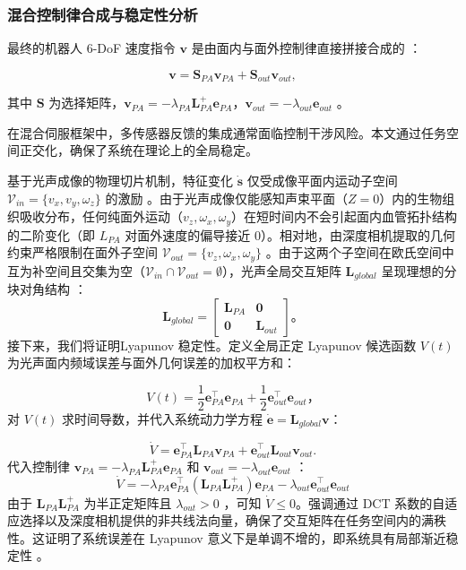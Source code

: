 \documentclass{article}
\begin{document}
\subsubsection{混合控制律合成与稳定性分析}
最终的机器人 6-DoF 速度指令 $\mathbf{v}$ 是由面内与面外控制律直接拼接合成的 ：

\begin{equation}
    \mathbf{v} = \mathbf{S}_{PA} \mathbf{v}_{PA} + \mathbf{S}_{out} \mathbf{v}_{out},
\end{equation}

其中 $\mathbf{S}$ 为选择矩阵，$\mathbf{v}_{PA} = -\lambda_{PA} \mathbf{L}_{PA}^+ \mathbf{e}_{PA}$，$\mathbf{v}_{out} = -\lambda_{out} \mathbf{e}_{out}$ 。

在混合伺服框架中，多传感器反馈的集成通常面临控制干涉风险。本文通过任务空间正交化，确保了系统在理论上的全局稳定。

基于光声成像的物理切片机制，特征变化 $\dot{\mathbf{s}}$ 仅受成像平面内运动子空间 $\mathcal{V}_{in} = \{v_x, v_y, \omega_z\}$ 的激励 。由于光声成像仅能感知声束平面（$Z=0$）内的生物组织吸收分布，任何纯面外运动（$v_z, \omega_x, \omega_y$）在短时间内不会引起面内血管拓扑结构的二阶变化（即 $L_{PA}$ 对面外速度的偏导接近 0）。相对地，由深度相机提取的几何约束严格限制在面外子空间 $\mathcal{V}_{out} = \{v_z, \omega_x, \omega_y\}$ 。由于这两个子空间在欧氏空间中互为补空间且交集为空（$\mathcal{V}_{in} \cap \mathcal{V}_{out} = \emptyset$），光声全局交互矩阵 $\mathbf{L}_{global}$ 呈现理想的分块对角结构 ：
\begin{equation}
    \mathbf{L}_{global} = \begin{bmatrix} \mathbf{L}_{PA} & \mathbf{0} \\ \mathbf{0} & \mathbf{L}_{out} \end{bmatrix}。
\end{equation}
接下来，我们将证明Lyapunov 稳定性。定义全局正定 Lyapunov 候选函数 $V(t)$ 为光声面内频域误差与面外几何误差的加权平方和：

\begin{equation}
    V(t) = \frac{1}{2} \mathbf{e}_{PA}^\top \mathbf{e}_{PA} + \frac{1}{2} \mathbf{e}_{out}^\top \mathbf{e}_{out}，
\end{equation}
对 $V(t)$ 求时间导数，并代入系统动力学方程 $\dot{\mathbf{e}} = \mathbf{L}_{global} \mathbf{v}$：

\begin{equation}
    \dot{V} = \mathbf{e}_{PA}^\top \mathbf{L}_{PA} \mathbf{v}_{PA} + \mathbf{e}_{out}^\top \mathbf{L}_{out} \mathbf{v}_{out}.
\end{equation}
代入控制律 $\mathbf{v}_{PA} = -\lambda_{PA} \mathbf{L}_{PA}^+ \mathbf{e}_{PA}$ 和 $\mathbf{v}_{out} = -\lambda_{out} \mathbf{e}_{out}$ ：
\begin{equation}
    \dot{V} = -\lambda_{PA} \mathbf{e}_{PA}^\top (\mathbf{L}_{PA} \mathbf{L}_{PA}^+) \mathbf{e}_{PA} - \lambda_{out} \mathbf{e}_{out}^\top \mathbf{e}_{out}
\end{equation}
由于 $\mathbf{L}_{PA} \mathbf{L}_{PA}^+$ 为半正定矩阵且 $\lambda_{out} > 0$ ，可知 $\dot{V} \le 0$。强调通过 DCT 系数的自适应选择以及深度相机提供的非共线法向量，确保了交互矩阵在任务空间内的满秩性。这证明了系统误差在 Lyapunov 意义下是单调不增的，即系统具有局部渐近稳定性 。
\end{document}
